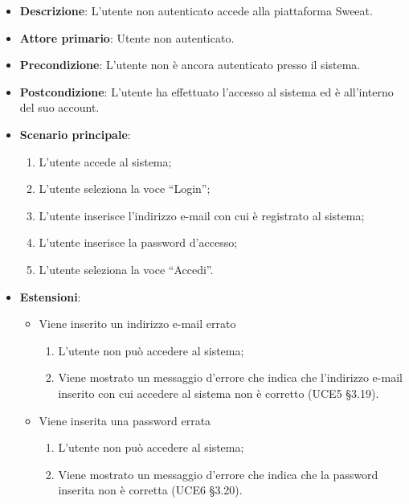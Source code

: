 \begin{itemize}
\item \textbf{Descrizione}: L'utente non autenticato accede alla piattaforma Sweeat.
\item \textbf{Attore primario}: Utente non autenticato.
\item \textbf{Precondizione}: L'utente non è ancora autenticato presso il sistema.
\item \textbf{Postcondizione}: L’utente ha effettuato l’accesso al sistema ed è all’interno del suo account.

\item \textbf{Scenario principale}:
\begin{enumerate}
\item L’utente accede al sistema;
\item L’utente seleziona la voce “Login”;
\item L’utente inserisce l’indirizzo e-mail con cui è registrato al sistema;
\item L’utente inserisce la password d’accesso; 
\item L’utente seleziona la voce “Accedi”. 
\end{enumerate}

\item \textbf{Estensioni}:
\begin{itemize}
\item Viene inserito un indirizzo e-mail errato 
\begin{enumerate}
	\item L’utente non può accedere al sistema;
	\item Viene mostrato un messaggio d’errore che indica che l'indirizzo e-mail inserito con cui accedere al sistema non è corretto (UCE5 §3.19). 
\end{enumerate}
\item Viene inserita una password errata
\begin{enumerate}
	\item L’utente non può accedere al sistema;
	\item Viene mostrato un messaggio d’errore che indica che la password inserita non è corretta (UCE6 §3.20).
\end{enumerate}
\end{itemize}
\end{itemize}